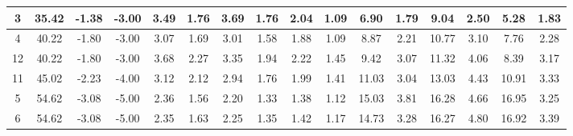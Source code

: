 \begin{table}[]
{\begin{tabular}{cccc|cccccc|cccccc|}
\multicolumn{1}{|c|}{3} & \multicolumn{1}{c|}{35.42} & \multicolumn{1}{c|}{-1.38} & -3.00 & \multicolumn{1}{c|}{3.49} & \multicolumn{1}{c|}{1.76} & \multicolumn{1}{c|}{3.69} & \multicolumn{1}{c|}{1.76} & \multicolumn{1}{c|}{2.04} & 1.09 & \multicolumn{1}{c|}{6.90} & \multicolumn{1}{c|}{1.79} & \multicolumn{1}{c|}{9.04} & \multicolumn{1}{c|}{2.50} & \multicolumn{1}{c|}{5.28} & 1.83 \\ \hline
\multicolumn{1}{|c|}{4} & \multicolumn{1}{c|}{40.22} & \multicolumn{1}{c|}{-1.80} & -3.00 & \multicolumn{1}{c|}{3.07} & \multicolumn{1}{c|}{1.69} & \multicolumn{1}{c|}{3.01} & \multicolumn{1}{c|}{1.58} & \multicolumn{1}{c|}{1.88} & 1.09 & \multicolumn{1}{c|}{8.87} & \multicolumn{1}{c|}{2.21} & \multicolumn{1}{c|}{10.77} & \multicolumn{1}{c|}{3.10} & \multicolumn{1}{c|}{7.76} & 2.28 \\ \hline
\multicolumn{1}{|c|}{12} & \multicolumn{1}{c|}{40.22} & \multicolumn{1}{c|}{-1.80} & -3.00 & \multicolumn{1}{c|}{3.68} & \multicolumn{1}{c|}{2.27} & \multicolumn{1}{c|}{3.35} & \multicolumn{1}{c|}{1.94} & \multicolumn{1}{c|}{2.22} & 1.45 & \multicolumn{1}{c|}{9.42} & \multicolumn{1}{c|}{3.07} & \multicolumn{1}{c|}{11.32} & \multicolumn{1}{c|}{4.06} & \multicolumn{1}{c|}{8.39} & 3.17 \\ \hline
\multicolumn{1}{|c|}{11} & \multicolumn{1}{c|}{45.02} & \multicolumn{1}{c|}{-2.23} & -4.00 & \multicolumn{1}{c|}{3.12} & \multicolumn{1}{c|}{2.12} & \multicolumn{1}{c|}{2.94} & \multicolumn{1}{c|}{1.76} & \multicolumn{1}{c|}{1.99} & 1.41 & \multicolumn{1}{c|}{11.03} & \multicolumn{1}{c|}{3.04} & \multicolumn{1}{c|}{13.03} & \multicolumn{1}{c|}{4.43} & \multicolumn{1}{c|}{10.91} & 3.33 \\ \hline
\multicolumn{1}{|c|}{5} & \multicolumn{1}{c|}{54.62} & \multicolumn{1}{c|}{-3.08} & -5.00 & \multicolumn{1}{c|}{2.36} & \multicolumn{1}{c|}{1.56} & \multicolumn{1}{c|}{2.20} & \multicolumn{1}{c|}{1.33} & \multicolumn{1}{c|}{1.38} & 1.12 & \multicolumn{1}{c|}{15.03} & \multicolumn{1}{c|}{3.81} & \multicolumn{1}{c|}{16.28} & \multicolumn{1}{c|}{4.66} & \multicolumn{1}{c|}{16.95} & 3.25 \\ \hline
\multicolumn{1}{|c|}{6} & \multicolumn{1}{c|}{54.62} & \multicolumn{1}{c|}{-3.08} & -5.00 & \multicolumn{1}{c|}{2.35} & \multicolumn{1}{c|}{1.63} & \multicolumn{1}{c|}{2.25} & \multicolumn{1}{c|}{1.35} & \multicolumn{1}{c|}{1.42} & 1.17 & \multicolumn{1}{c|}{14.73} & \multicolumn{1}{c|}{3.28} & \multicolumn{1}{c|}{16.27} & \multicolumn{1}{c|}{4.80} & \multicolumn{1}{c|}{16.92} & 3.39 \\ \hline

\end{tabular}}
\end{table}
